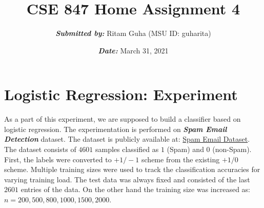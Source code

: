 \documentclass[11pt]{article}
\title{\textbf{CSE 847 Home Assignment 4}}
\author{\textbf{\textit{Submitted by:}} Ritam Guha (MSU ID: guharita)}
\date{\textbf{\textit{Date:}} March 31, 2021}
\begin{document}
\maketitle

\thispagestyle {empty}

\newcommand{\lsp}[1]{\large\renewcommand{\baselinestretch}{#1}\normalsize}
\newcommand{\hsp}{\hspace{.2in}}
\newcommand{\comment}[1]{}
\newtheorem{thm}{Theorem}[section]
\newtheorem{lem}{Lemma}[section]
\newtheorem{cor}{Corollary}[section]
\newtheorem{prop}{Proposition}[section]
\newtheorem{problem}{Problem}[section]

\newcommand{\R}{{\rm\hbox{I\kern-.15em R}}}
\newcommand{\IR}{{\rm\hbox{I\kern-.15em R}}}
\newcommand{\II}{{\rm\hbox{I\kern-.15em I}}}
\newcommand{\IN}{{\rm\hbox{I\kern-.15em N}}}
\newcommand{\IZ}{{\sf\hbox{Z\kern-.40em Z}}}
\newcommand{\IS}{{\rm\hbox{S\kern-.45em S}}}
\newcommand{\Real}{I\!\!R}


\newcommand{\linesep}{\vspace{.2cm}\hrule\vspace{0.2cm}}
\newcommand{\categorysep}{\vspace{0.5cm}}
\newcommand{\entrysep}{\vspace{0cm}}

\newcommand{\category}[1]{\categorysep
                  \noindent {\bf \large #1}
              \linesep}

\pagestyle{empty}

\section{\textbf{Logistic Regression: Experiment}}
As a part of this experiment, we are supposed to build a classifier based on logistic regression. The experimentation is performed on \textbf{\textit{Spam Email Detection}} dataset. The dataset is publicly available at: \href{https://github.com/jiayuzhou/CSE847/tree/master/data/spam_email}{Spam Email Dataset}. The dataset  consists of $4601$ samples classified as $1$ (Spam) and $0$ (non-Spam).\\

First, the labels were converted to $+1/-1$ scheme from the existing $+1/0$ scheme. Multiple training sizes were used to track the classification accuracies for varying training load. The test data was always fixed and consisted of the last $2601$ entries of the data. On the other hand the training size was increased as: $n = 200, 500, 800, 1000, 1500, 2000$. 
 
\end{document}
